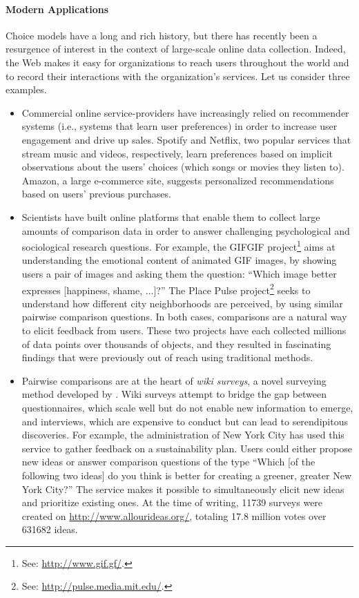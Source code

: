 \paragraph{Modern Applications}
Choice models have a long and rich history, but there has recently been a resurgence of interest in the context of large-scale online data collection.
Indeed, the Web makes it easy for organizations to reach users throughout the world and to record their interactions with the organization's services.
Let us consider three examples.
\begin{itemize}
\item Commercial online service-providers have increasingly relied on recommender systems (i.e., systems that learn user preferences) in order to increase user engagement and drive up sales.
Spotify and Netflix, two popular services that stream music and videos, respectively, learn preferences based on implicit observations about the users' choices (which songs or movies they listen to).
Amazon, a large e-commerce site, suggests personalized recommendations based on users' previous purchases.

\item Scientists have built online platforms that enable them to collect large amounts of comparison data in order to answer challenging psychological and sociological research questions.
For example, the GIFGIF project\footnote{See: \url{http://www.gif.gf/}.} aims at understanding the emotional content of animated GIF images, by showing users a pair of images and asking them the question: ``Which image better expresses [happiness, shame, ...]?''
The Place Pulse project\footnote{See: \url{http://pulse.media.mit.edu/}.} seeks to understand how different city neighborhoods are perceived, by using similar pairwise comparison questions.
In both cases, comparisons are a natural way to elicit feedback from users.
These two projects have each collected millions of data points over thousands of objects, and they resulted in fascinating findings that were previously out of reach using traditional methods. 

\item Pairwise comparisons are at the heart of \emph{wiki surveys}, a novel surveying method developed by \citet{salganik2015wiki}.
Wiki surveys attempt to bridge the gap between questionnaires, which scale well but do not enable new information to emerge, and interviews, which are expensive to conduct but can lead to serendipitous discoveries.
For example, the administration of New York City has used this service to gather feedback on a sustainability plan.
Users could either propose new ideas or answer comparison questions of the type ``Which [of the following two ideas] do you think is better for creating a greener, greater New York City?''
The service makes it possible to simultaneously elicit new ideas and prioritize existing ones.
At the time of writing, \num{11739} surveys were created on \url{http://www.allourideas.org/}, totaling \num{17.8} million votes over \num{631682} ideas.
\end{itemize}

